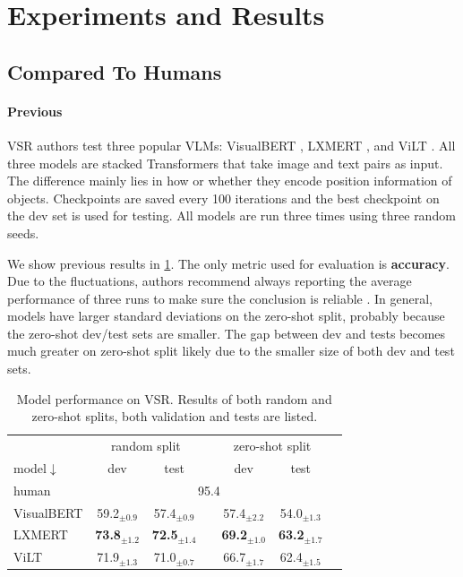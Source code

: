 \section{Experiments and Results} \label{sec:vsr_experiments_results}

\subsection{Compared To Humans}

\paragraph{Previous}
VSR authors \cite{liu2022visual} test three popular VLMs: VisualBERT \cite{li2019visualbert}, LXMERT \cite{tan2020lxmert}, and
ViLT \cite{kim2021vilt}. All three models are stacked Transformers \cite{vaswani2017attention} that take image and text pairs as input. The difference mainly lies in how or whether they encode position information of objects. Checkpoints are saved every 100 iterations and the best checkpoint on the dev set is used for testing. All models are run three times using three random seeds.

We show previous results in \cref{tab:vsr_results_base}. The only metric used for evaluation is \textbf{accuracy}. Due to the fluctuations, authors recommend always reporting the average performance of three runs to make sure the conclusion is reliable \cite{liu2022visual}. In general, models have larger standard deviations on the zero-shot split, probably because the zero-shot dev/test sets are smaller. The gap between dev and tests becomes much greater on zero-shot split likely due to the smaller size of both dev and test sets.

\begin{table}[ht]
\centering
\small
\begin{tabular}{lcccccc}
\toprule
& \multicolumn{2}{c}{random split} &  & \multicolumn{2}{c}{zero-shot split} \\
\cmidrule(l){2-3} 	\cmidrule(l){4-6}
model$\downarrow$ & dev & test & & dev & test  \\
\midrule
human & \multicolumn{5}{c}{95.4}   \\
\midrule
VisualBERT & 59.2$_{\pm0.9}$ & 57.4$_{\pm0.9}$ & & 57.4$_{\pm2.2}$  & 54.0$_{\pm1.3}$  \\ 
LXMERT & \textbf{73.8}$_{\pm1.2}$  & \textbf{72.5}$_{\pm1.4}$ & & \textbf{69.2}$_{\pm1.0}$  & \textbf{63.2}$_{\pm1.7}$  \\ 
ViLT & 71.9$_{\pm1.3}$  & 71.0$_{\pm0.7}$  & & 66.7$_{\pm1.7}$  & 62.4$_{\pm1.5}$ \\ 
\bottomrule
\end{tabular}
\caption{Model performance on VSR. Results of both random and zero-shot splits, both validation and tests are listed.}
\label{tab:vsr_results_base}
\end{table}

